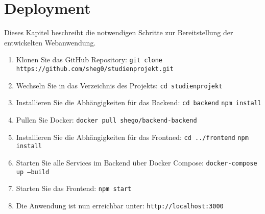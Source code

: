 \chapter{Deployment}
Dieses Kapitel beschreibt die notwendigen Schritte zur Bereitstellung der entwickelten Webanwendung. 
\begin{enumerate}
    \item Klonen Sie das GitHub Repository:\newline
    \texttt{git clone https://github.com/sheg0/studienprojekt.git}
    \item Wechseln Sie in das Verzeichnis des Projekts:\newline
    \texttt{cd studienprojekt}
    \item Installieren Sie die Abhängigkeiten für das Backend:\newline
    \texttt{cd backend}\newline
    \texttt{npm install}
    \item Pullen Sie Docker:\newline
    \texttt{docker pull shego/backend-backend}
    \item Installieren Sie die Abhängigkeiten für das Frontned:\newline
    \texttt{cd ../frontend}\newline
    \texttt{npm install}
    \item Starten Sie alle Services im Backend über Docker Compose:\newline
    \texttt{docker-compose up --build}
    \item Starten Sie das Frontend:\newline
    \texttt{npm start}
    \item Die Anwendung ist nun erreichbar unter:\newline
    \texttt{http://localhost:3000}
\end{enumerate}
